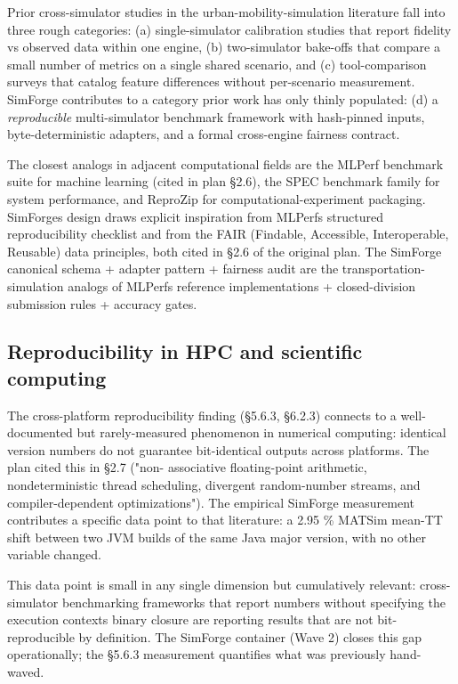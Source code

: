 Prior cross-simulator studies in the urban-mobility-simulation
literature fall into three rough categories: (a) single-simulator
calibration studies that report fidelity vs observed data within one
engine, (b) two-simulator bake-offs that compare a small number of
metrics on a single shared scenario, and (c) tool-comparison surveys
that catalog feature differences without per-scenario measurement.
SimForge contributes to a category prior work has only thinly populated:
(d) a \emph{reproducible} multi-simulator benchmark framework with
hash-pinned inputs, byte-deterministic adapters, and a formal
cross-engine fairness contract.

The closest analogs in adjacent computational fields are the MLPerf
benchmark suite for machine learning (cited in plan §2.6), the SPEC
benchmark family for system performance, and ReproZip for
computational-experiment packaging. SimForge\textquotesingle s design
draws explicit inspiration from MLPerf\textquotesingle s structured
reproducibility checklist and from the FAIR (Findable, Accessible,
Interoperable, Reusable) data principles, both cited in §2.6 of the
original plan. The SimForge canonical schema + adapter pattern +
fairness audit are the transportation-simulation analogs of
MLPerf\textquotesingle s reference implementations + closed-division
submission rules + accuracy gates.

\subsection{Reproducibility in HPC and scientific
computing}\label{632-reproducibility-in-hpc-and-scientific-computing}

The cross-platform reproducibility finding (§5.6.3, §6.2.3) connects to
a well-documented but rarely-measured phenomenon in numerical computing:
identical version numbers do not guarantee bit-identical outputs across
platforms. The plan cited this in §2.7 ("non- associative
floating-point arithmetic, nondeterministic thread scheduling, divergent
random-number streams, and compiler-dependent optimizations"). The
empirical SimForge measurement contributes a specific data point to that
literature: a 2.95 \% MATSim mean-TT shift between two JVM builds of the
same Java major version, with no other variable changed.

This data point is small in any single dimension but cumulatively
relevant: cross-simulator benchmarking frameworks that report numbers
without specifying the execution context\textquotesingle s binary
closure are reporting results that are not bit-reproducible by
definition. The SimForge container (Wave 2) closes this gap
operationally; the §5.6.3 measurement quantifies what was previously
hand-waved.

